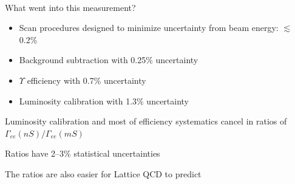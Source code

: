 \documentclass[landscape]{article}
\newenvironment{slide}[1][ ]{\mbox{\boldmath \bf #1 } \vfill}{\vfill \mbox{ } \pagebreak}
\begin{document}
\begin{slide}

What went into this measurement?

\vspace{1 cm}
\begin{itemize}\setlength{\itemsep}{1 cm}

  \item Scan procedures designed to minimize uncertainty from beam energy: $\lesssim$ 0.2\%

  \item Background subtraction with 0.25\% uncertainty

  \item $\Upsilon$ efficiency with 0.7\% uncertainty

  \item Luminosity calibration with 1.3\% uncertainty

\end{itemize}

\vspace{2 cm}
Luminosity calibration and most of efficiency systematics cancel in ratios of $\Gamma_{ee}(nS)/\Gamma_{ee}(mS)$

Ratios have 2--3\% statistical uncertainties

\vspace{1 cm}
The ratios are also easier for Lattice QCD to predict

\end{slide}
\end{document}
